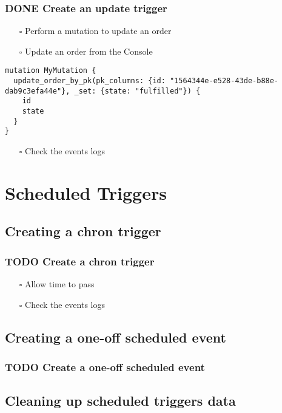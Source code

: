 \documentclass[11pt]{article}
\begin{document}
\subsubsection{{\bfseries\sffamily DONE} Create an update trigger}
\label{sec:org2690f68}
\begin{itemize}
\item[{$\square$}] Perform a mutation to update an order
\item[{$\square$}] Update an order from the Console
\end{itemize}
\begin{verbatim}
mutation MyMutation {
  update_order_by_pk(pk_columns: {id: "1564344e-e528-43de-b88e-dab9c3efa44e"}, _set: {state: "fulfilled"}) {
    id
    state
  }
}
\end{verbatim}
\begin{itemize}
\item[{$\square$}] Check the events logs
\end{itemize}
\section{Scheduled Triggers}
\label{sec:org17a6475}
\subsection{Creating a chron trigger}
\label{sec:org5c5314e}
\subsubsection{{\bfseries\sffamily TODO} Create a chron trigger}
\label{sec:org501cf47}
\begin{itemize}
\item[{$\square$}] Allow time to pass
\item[{$\square$}] Check the events logs
\end{itemize}
\subsection{Creating a one-off scheduled event}
\label{sec:orgff70621}
\subsubsection{{\bfseries\sffamily TODO} Create a one-off scheduled event}
\label{sec:org67b05c9}
\subsection{Cleaning up scheduled triggers data}
\label{sec:org180ea80}
\end{document}
